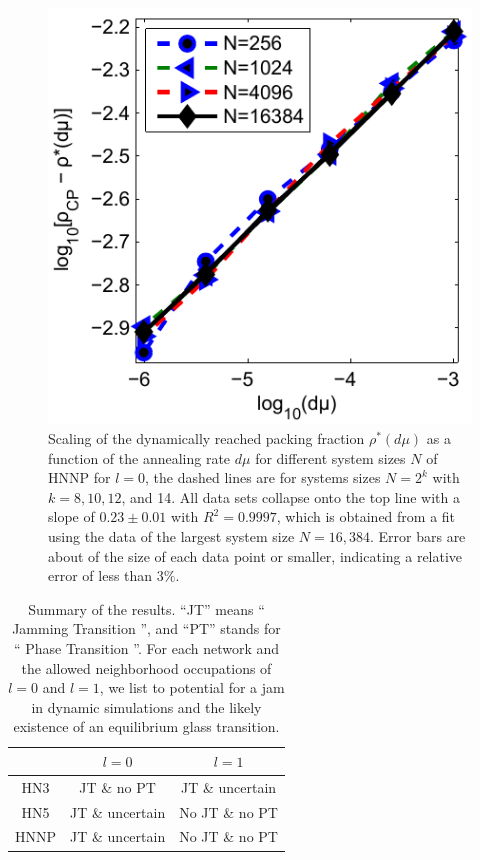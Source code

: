 \begin{figure}
\centering \includegraphics[width=0.5\columnwidth]{Chapter-2/Paper_HNNP_Decay}
\protect\caption{Scaling of the dynamically reached packing fraction $\rho^{*}(d\mu)$
as a function of the annealing rate $d\mu$ for different system sizes
$N$ of HNNP for $l=0$, the dashed lines are for systems sizes $N=2^{k}$
with $k=8,10,12$, and 14. All data sets collapse onto the top line
with a slope of $0.23\pm0.01$ with $R^{2}=0.9997$, which is obtained
from a fit using the data of the largest system size $N=16,384$. Error
bars are about of the size of each data point or smaller, indicating
a relative error of less than $3\%$. }

\label{fig:HNNPDecay} 
\end{figure}


\begin{table}
\begin{centering}
\protect\caption{Summary of the results. \enquote{JT} means \enquote{ Jamming Transition }, and \enquote{PT} stands for \enquote{ Phase Transition }. For each network and the allowed neighborhood
occupations of $l=0$ and $l=1$, we list to potential for a jam in
dynamic simulations and the likely existence of an equilibrium glass
transition.}

\par\end{centering}

\begin{centering}
\label{tab:summary}
\par\end{centering}

\centering{}%
\begin{tabular}{|c|c||c|}
\hline 
 & $l=0$  & $l=1$ \tabularnewline
\hline 
\hline 
HN3  & JT \& no PT  & JT \& uncertain \tabularnewline
\hline 
HN5  & JT \& uncertain  & No JT \& no PT \tabularnewline
\hline 
HNNP  & JT \& uncertain  & No JT \& no PT \tabularnewline
\hline 
\end{tabular}
\end{table}



